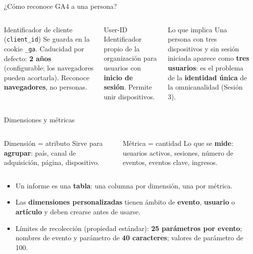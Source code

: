 \documentclass[aspectratio=169,xcolor=dvipsnames]{beamer}
\begin{document}
\begin{frame}{¿Cómo reconoce GA4 a una persona?}
\begin{columns}[T]
  \begin{block}{Identificador de cliente (\texttt{client\_id})}
    \small Se guarda en la cookie \texttt{\_ga}. Caducidad por defecto: \textbf{2 años} (configurable; los navegadores pueden acortarla). Reconoce \textbf{navegadores}, no personas.
  \end{block}
  \begin{exampleblock}{User-ID}
    \small Identificador propio de la organización para usuarios con \textbf{inicio de sesión}. Permite unir dispositivos.
  \end{exampleblock}
  \begin{alertblock}{Lo que implica}
    \small Una persona con tres dispositivos y sin sesión iniciada aparece como \textbf{tres usuarios}: es el problema de la \textbf{identidad única} de la omnicanalidad (Sesión 3).
  \end{alertblock}
\end{columns}
\end{frame}

\begin{frame}{Dimensiones y métricas}
\begin{columns}[T]
  \begin{block}{Dimensión = atributo}
    \small Sirve para \textbf{agrupar}: país, canal de adquisición, página, dispositivo.
  \end{block}
  \begin{exampleblock}{Métrica = cantidad}
    \small Lo que se \textbf{mide}: usuarios activos, sesiones, número de eventos, eventos clave, ingresos.
  \end{exampleblock}
\end{columns}
\vspace{6pt}
\begin{itemize}
  \small
  \item Un informe es una \textbf{tabla}: una columna por dimensión, una por métrica.
  \item Las \textbf{dimensiones personalizadas} tienen ámbito de \textbf{evento}, \textbf{usuario} o \textbf{artículo} y deben crearse antes de usarse.
  \item Límites de recolección (propiedad estándar): \textbf{25 parámetros por evento}; nombres de evento y parámetro de \textbf{40 caracteres}; valores de parámetro de 100.
\end{itemize}
\end{frame}
\end{document}
